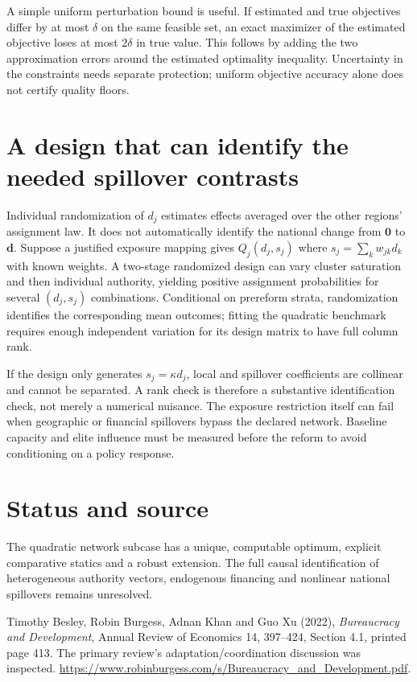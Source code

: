 \documentclass[11pt]{article}
\begin{document}
A simple uniform perturbation bound is useful. If estimated and true objectives differ by at most $\delta$ on the same feasible set, an exact maximizer of the estimated objective loses at most $2\delta$ in true value. This follows by adding the two approximation errors around the estimated optimality inequality. Uncertainty in the constraints needs separate protection; uniform objective accuracy alone does not certify quality floors.

\section*{A design that can identify the needed spillover contrasts}
Individual randomization of $d_j$ estimates effects averaged over the other regions' assignment law. It does not automatically identify the national change from $\mathbf0$ to $\mathbf d$. Suppose a justified exposure mapping gives $Q_j(d_j,s_j)$ where $s_j=\sum_kw_{jk}d_k$ with known weights. A two-stage randomized design can vary cluster saturation and then individual authority, yielding positive assignment probabilities for several $(d_j,s_j)$ combinations. Conditional on prereform strata, randomization identifies the corresponding mean outcomes; fitting the quadratic benchmark requires enough independent variation for its design matrix to have full column rank.

If the design only generates $s_j=\kappa d_j$, local and spillover coefficients are collinear and cannot be separated. A rank check is therefore a substantive identification check, not merely a numerical nuisance. The exposure restriction itself can fail when geographic or financial spillovers bypass the declared network. Baseline capacity and elite influence must be measured before the reform to avoid conditioning on a policy response.

\section*{Status and source}
The quadratic network subcase has a unique, computable optimum, explicit comparative statics and a robust extension. The full causal identification of heterogeneous authority vectors, endogenous financing and nonlinear national spillovers remains unresolved.

Timothy Besley, Robin Burgess, Adnan Khan and Guo Xu (2022), \emph{Bureaucracy and Development}, Annual Review of Economics 14, 397--424, Section 4.1, printed page 413. The primary review's adaptation/coordination discussion was inspected. \url{https://www.robinburgess.com/s/Bureaucracy_and_Development.pdf}.
\end{document}
